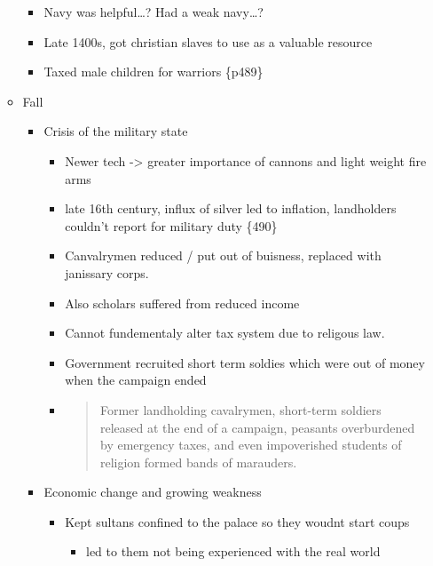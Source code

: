 \documentclass[letterpaper]{article}
\begin{document}
\begin{itemize}
\begin{itemize}
\begin{itemize}
\item Navy was helpful\ldots{}? Had a weak navy\ldots{}?\\
\item Late 1400s, got christian slaves to use as a valuable resource
\item Taxed male children for warriors \{p489\}
\end{itemize}

\item Fall

\begin{itemize}
\item Crisis of the military state

\begin{itemize}
\item Newer tech -> greater importance of cannons and light weight
fire arms

\item late 16th century, influx of silver led to inflation,
landholders couldn't report for military duty \{490\}

\item Canvalrymen reduced / put out of buisness, replaced with
janissary corps.

\item Also scholars suffered from reduced income\\

\item Cannot fundementaly alter tax system due to religous law.

\item Government recruited short term soldies which were out of money
when the campaign ended

\item \begin{quote}
Former landholding cavalrymen, short-term soldiers released at
the end of a campaign, peasants overburdened by emergency
taxes, and even impoverished students of religion formed bands
of marauders.
\end{quote}
\end{itemize}

\item Economic change and growing weakness

\begin{itemize}
\item Kept sultans confined to the palace so they woudnt start coups

\begin{itemize}
\item led to them not being experienced with the real world
\end{itemize}


\end{itemize}
\end{itemize}
\end{itemize}
\end{itemize}
\end{document}
